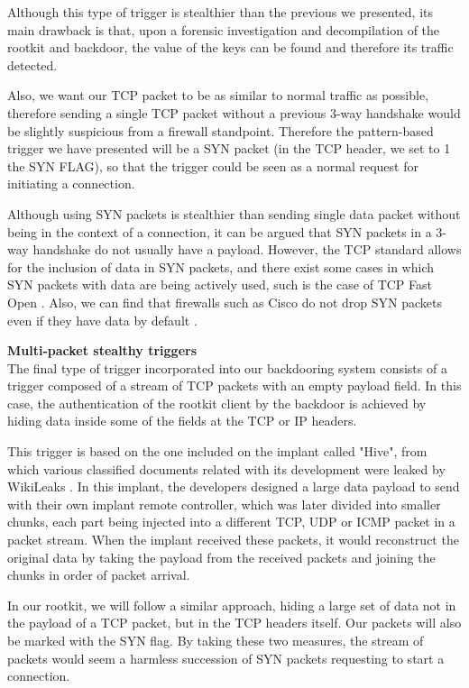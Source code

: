 Although this type of trigger is stealthier than the previous we presented, its main drawback is that, upon a forensic investigation and decompilation of the rootkit and backdoor, the value of the keys can be found and therefore its traffic detected. 

Also, we want our TCP packet to be as similar to normal traffic as possible, therefore sending a single TCP packet without a previous 3-way handshake would be slightly suspicious from a firewall standpoint. Therefore the pattern-based trigger we have presented will be a SYN packet (in the TCP header, we set to 1 the SYN FLAG), so that the trigger could be seen as a normal request for initiating a connection.

Although using SYN packets is stealthier than sending single data packet without being in the context of a connection, it can be argued that SYN packets in a 3-way handshake do not usually have a payload. However, the TCP standard allows for the inclusion of data in SYN packets, and there exist some cases in which SYN packets with data are being actively used, such is the case of TCP Fast Open \cite{tcp_syn_payload} \cite{rfc_tcp4}. Also, we can find that firewalls such as Cisco do not drop SYN packets even if they have data by default \cite{cisco_syn_firewall}.


\textbf{Multi-packet stealthy triggers}\\
The final type of trigger incorporated into our backdooring system consists of a trigger composed of a stream of TCP packets with an empty payload field. In this case, the authentication of the rootkit client by the backdoor is achieved by hiding data inside some of the fields at the TCP or IP headers. 

This trigger is based on the one included on the implant called "Hive", from which various classified documents related with its development were leaked by WikiLeaks \cite{hive_implant}. In this implant, the developers designed a large data payload to send with their own implant remote controller, which was later divided into smaller chunks, each part being injected into a different TCP, UDP or ICMP packet in a packet stream. When the implant received these packets, it would reconstruct the original data by taking the payload from the received packets and joining the chunks in order of packet arrival.

In our rootkit, we will follow a similar approach, hiding a large set of data not in the payload of a TCP packet, but in the TCP headers itself. Our packets will also be marked with the SYN flag. By taking these two measures, the stream of packets would seem a harmless succession of SYN packets requesting to start a connection.


